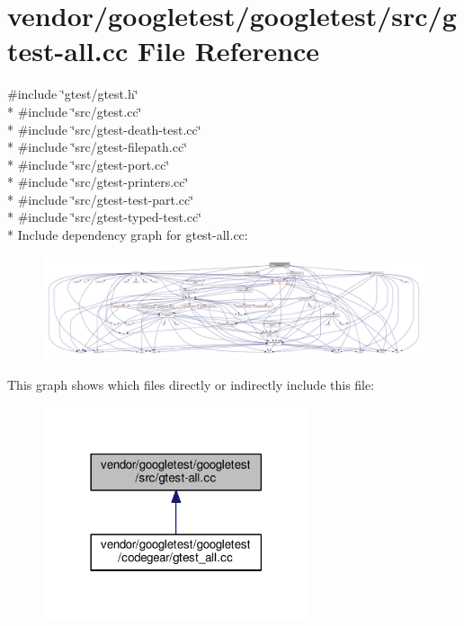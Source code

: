 \hypertarget{gtest-all_8cc}{}\section{vendor/googletest/googletest/src/gtest-\/all.cc File Reference}
\label{gtest-all_8cc}
{\ttfamily \#include \char`\"{}gtest/gtest.\+h\char`\"{}}\\*
{\ttfamily \#include \char`\"{}src/gtest.\+cc\char`\"{}}\\*
{\ttfamily \#include \char`\"{}src/gtest-\/death-\/test.\+cc\char`\"{}}\\*
{\ttfamily \#include \char`\"{}src/gtest-\/filepath.\+cc\char`\"{}}\\*
{\ttfamily \#include \char`\"{}src/gtest-\/port.\+cc\char`\"{}}\\*
{\ttfamily \#include \char`\"{}src/gtest-\/printers.\+cc\char`\"{}}\\*
{\ttfamily \#include \char`\"{}src/gtest-\/test-\/part.\+cc\char`\"{}}\\*
{\ttfamily \#include \char`\"{}src/gtest-\/typed-\/test.\+cc\char`\"{}}\\*
Include dependency graph for gtest-\/all.cc\+:\nopagebreak
\begin{figure}[H]
\begin{center}
\leavevmode
\includegraphics[width=350pt]{gtest-all_8cc__incl}
\end{center}
\end{figure}
This graph shows which files directly or indirectly include this file\+:\nopagebreak
\begin{figure}[H]
\begin{center}
\leavevmode
\includegraphics[width=222pt]{gtest-all_8cc__dep__incl}
\end{center}
\end{figure}
